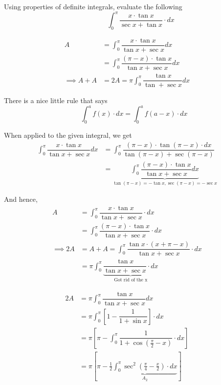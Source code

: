 \documentclass[14pt,fleqn]{extarticle}
\begin{document}
Using properties of definite integrals, 
evaluate the following 
\[ \qquad \qquad \int_0^\pi\dfrac{x\cdot\tan x}{\sec x + \tan x} \cdot dx \]
%

\newcard 

\begin{align}
A &= \int_0^\pi \dfrac{x\cdot\tan x}{\tan x+\sec x}dx \\
&= \int_0^\pi \dfrac{(\pi-x)\cdot\tan x}{\tan x+\sec x}dx \\
\implies A + A &= 2A = \pi\int_0^\pi\dfrac{\tan x}{\tan + \sec x}dx 
\end{align}

\newcard 

There is a nice little rule that says 
\[ \qquad \int_0^a f(x)\cdot dx = \int_0^a f(a-x)\cdot dx \] 

When applied to the given integral, we get 
%
\begin{align}
\int_0^\pi \dfrac{x\cdot\tan x}{\tan x + \sec x} dx
&= \int_0^\pi\dfrac{(\pi -x)\cdot\tan (\pi-x)\cdot dx}{\tan(\pi-x) + \sec(\pi -x)} \\
&= \underbrace{\int_0^\pi\dfrac{(\pi - x)\cdot \tan x}{\tan x + \sec x}dx}
_{\tan(\pi-x) = -\tan x, \sec(\pi -x) = -\sec x}
\end{align}


And hence, 
%
\begin{align}
  A &= \int_0^\pi\dfrac{x\cdot\tan x}{\tan x + \sec x}\cdot dx \\
  &= \int_0^\pi\dfrac{(\pi - x)\cdot \tan x}{\tan x + \sec x}\cdot dx \\
  \implies 2A &= A + A = \int_0^\pi\dfrac{\tan x\cdot (x + \pi -x)}{\tan x+\sec x}\cdot dx \\
  &= \pi\int_0^\pi\underbrace{\dfrac{\tan x}{\tan x + \sec x}\cdot dx}_{\text{Got rid of the x}}
\end{align}

\newcard 

\begin{align}
2A &= \pi\int_0^\pi\dfrac{\tan x}{\tan x + \sec x}dx \\ 
&= \pi\int_0^\pi\left[1-\dfrac{1}{1+\sin x}\right]\cdot dx \\
&= \pi\left[\pi - \int_0^\pi\dfrac{1}{1+\cos \left(\frac{\pi}{2}-x\right)}\cdot dx\right] \\
&= \pi\left[\pi - \frac{1}{2}\underbrace{\int_0^\pi\sec^2\left(\frac{\pi}{4}-\frac{x}{2}\right)\cdot dx}_{A_2}\right]
\end{align}
\end{document}
